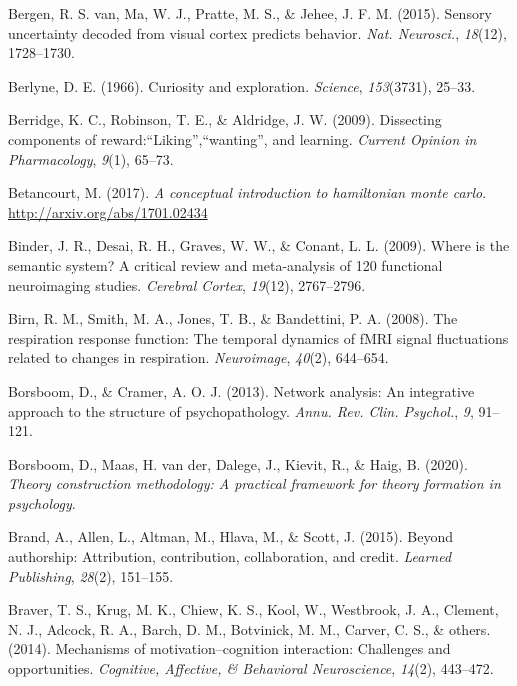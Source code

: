 \documentclass[11pt,american,a4paper,oneside,]{memoir} %
\begin{document}
\leavevmode\hypertarget{ref-Van_Bergen2015-kl}{}%
Bergen, R. S. van, Ma, W. J., Pratte, M. S., \& Jehee, J. F. M. (2015). Sensory uncertainty decoded from visual cortex predicts behavior. \emph{Nat. Neurosci.}, \emph{18}(12), 1728--1730.

\leavevmode\hypertarget{ref-berlyne1966curiosity}{}%
Berlyne, D. E. (1966). Curiosity and exploration. \emph{Science}, \emph{153}(3731), 25--33.

\leavevmode\hypertarget{ref-berridge2009dissecting}{}%
Berridge, K. C., Robinson, T. E., \& Aldridge, J. W. (2009). Dissecting components of reward:``Liking'',``wanting'', and learning. \emph{Current Opinion in Pharmacology}, \emph{9}(1), 65--73.

\leavevmode\hypertarget{ref-Betancourt2017-rj}{}%
Betancourt, M. (2017). \emph{A conceptual introduction to hamiltonian monte carlo}. \url{http://arxiv.org/abs/1701.02434}

\leavevmode\hypertarget{ref-binder2009semantic}{}%
Binder, J. R., Desai, R. H., Graves, W. W., \& Conant, L. L. (2009). Where is the semantic system? A critical review and meta-analysis of 120 functional neuroimaging studies. \emph{Cerebral Cortex}, \emph{19}(12), 2767--2796.

\leavevmode\hypertarget{ref-Birn2008-ti}{}%
Birn, R. M., Smith, M. A., Jones, T. B., \& Bandettini, P. A. (2008). The respiration response function: The temporal dynamics of fMRI signal fluctuations related to changes in respiration. \emph{Neuroimage}, \emph{40}(2), 644--654.

\leavevmode\hypertarget{ref-Borsboom2013-wb}{}%
Borsboom, D., \& Cramer, A. O. J. (2013). Network analysis: An integrative approach to the structure of psychopathology. \emph{Annu. Rev. Clin. Psychol.}, \emph{9}, 91--121.

\leavevmode\hypertarget{ref-Borsboom2020-xg}{}%
Borsboom, D., Maas, H. van der, Dalege, J., Kievit, R., \& Haig, B. (2020). \emph{Theory construction methodology: A practical framework for theory formation in psychology}.

\leavevmode\hypertarget{ref-brand2015beyond}{}%
Brand, A., Allen, L., Altman, M., Hlava, M., \& Scott, J. (2015). Beyond authorship: Attribution, contribution, collaboration, and credit. \emph{Learned Publishing}, \emph{28}(2), 151--155.

\leavevmode\hypertarget{ref-braver2014mechanisms}{}%
Braver, T. S., Krug, M. K., Chiew, K. S., Kool, W., Westbrook, J. A., Clement, N. J., Adcock, R. A., Barch, D. M., Botvinick, M. M., Carver, C. S., \& others. (2014). Mechanisms of motivation--cognition interaction: Challenges and opportunities. \emph{Cognitive, Affective, \& Behavioral Neuroscience}, \emph{14}(2), 443--472.
\end{document}
